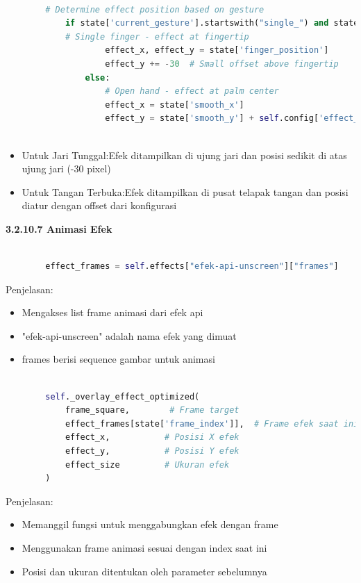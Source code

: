 \documentclass[11pt,a4paper]{article}
\begin{document}
    \begin{lstlisting}[language=Python, caption=Penentuan Posisi Efek]
    
        # Determine effect position based on gesture
            if state['current_gesture'].startswith("single_") and state['finger_position']:
            # Single finger - effect at fingertip
                    effect_x, effect_y = state['finger_position']
                    effect_y += -30  # Small offset above fingertip
                else:
                    # Open hand - effect at palm center
                    effect_x = state['smooth_x']
                    effect_y = state['smooth_y'] + self.config['effect_y_offset']
                    
    \end{lstlisting}
    \begin{itemize}
        \item Untuk Jari Tunggal:Efek ditampilkan di ujung jari dan posisi sedikit di atas ujung jari (-30 pixel)
        \item Untuk Tangan Terbuka:Efek ditampilkan di pusat telapak tangan dan posisi diatur dengan offset dari konfigurasi
    \end{itemize}
    

    \noindent\textbf{3.2.10.7 Animasi Efek}
    \begin{lstlisting}[language=Python, caption=Mengambil Frame Efek]
    
        effect_frames = self.effects["efek-api-unscreen"]["frames"]
    \end{lstlisting}
    Penjelasan:
    \begin{itemize}
        \item Mengakses list frame animasi dari efek api
        \item "efek-api-unscreen" adalah nama efek yang dimuat
        \item frames berisi sequence gambar untuk animasi
    \end{itemize}

    \begin{lstlisting}[language=Python, caption=Overlay Efek]
    
        self._overlay_effect_optimized(
            frame_square,        # Frame target
            effect_frames[state['frame_index']],  # Frame efek saat ini
            effect_x,           # Posisi X efek
            effect_y,           # Posisi Y efek
            effect_size         # Ukuran efek
        )
    \end{lstlisting}
    Penjelasan:
    \begin{itemize}
        \item Memanggil fungsi untuk menggabungkan efek dengan frame
        \item Menggunakan frame animasi sesuai dengan index saat ini
        \item Posisi dan ukuran ditentukan oleh parameter sebelumnya
    \end{itemize}
\end{document}
